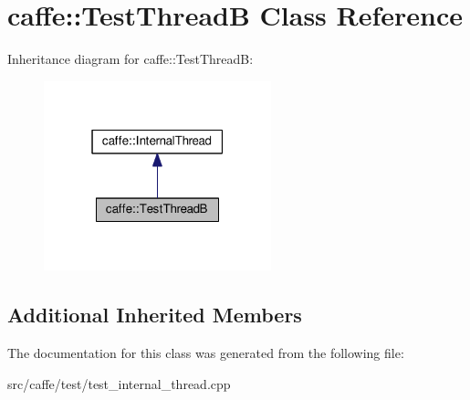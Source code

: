 \hypertarget{classcaffe_1_1_test_thread_b}{}\section{caffe\+:\+:Test\+ThreadB Class Reference}
\label{classcaffe_1_1_test_thread_b}


Inheritance diagram for caffe\+:\+:Test\+ThreadB\+:
\nopagebreak
\begin{figure}[H]
\begin{center}
\leavevmode
\includegraphics[width=187pt]{classcaffe_1_1_test_thread_b__inherit__graph}
\end{center}
\end{figure}
\subsection*{Additional Inherited Members}


The documentation for this class was generated from the following file\+:\begin{DoxyCompactItemize}
\item 
src/caffe/test/test\+\_\+internal\+\_\+thread.\+cpp\end{DoxyCompactItemize}
